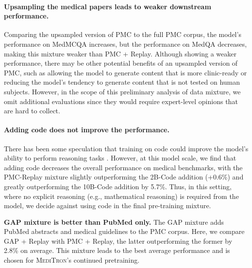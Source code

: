 \documentclass{article}
\newcommand{\mtron}{\textsc{MediTron}\xspace}
\begin{document}
\paragraph{Upsampling the medical papers leads to weaker downstream performance.} Comparing the upsampled version of PMC to the full PMC corpus, the model's performance on MedMCQA increases, but the performance on MedQA decreases, making this mixture weaker than PMC + Replay. Although showing a weaker performance, there may be other potential benefits of an upsampled version of PMC, such as allowing the model to generate content that is more clinic-ready or reducing the model's tendency to generate content that is not tested on human subjects. However, in the scope of this preliminary analysis of data mixture, we omit additional evaluations since they would require expert-level opinions that are hard to collect. 

\paragraph{Adding code does not improve the performance.} There has been some speculation that training on code could improve the model's ability to perform reasoning tasks \citep{chen2021evaluating}. However, at this model scale, we find that adding code decreases the overall performance on medical benchmarks, with the PMC-Replay mixture slightly outperforming the 2B-Code addition (+0.6\%) and greatly outperforming the 10B-Code addition by 5.7\%. Thus, in this setting, where no explicit reasoning (e.g., mathematical reasoning) is required from the model, we decide against using code in the final pre-training mixture.

\textbf{GAP mixture is better than PubMed only.} The GAP mixture adds PubMed abstracts and medical guidelines to the PMC corpus. Here, we compare GAP + Replay with PMC + Replay, the latter outperforming the former by 2.8\% on average. This mixture leads to the best average performance and is chosen for \mtron's continued pretraining.
\end{document}

